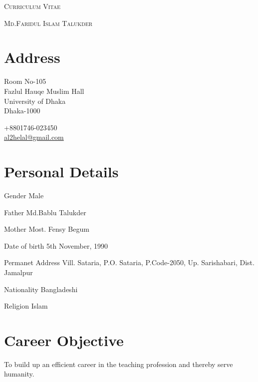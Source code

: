 \documentclass[a4paper]{article}
\begin{document}
\pagestyle{empty}

\begin{center}
\huge{\textsc{Curriculum Vitae}}
\vspace{\baselineskip}

\Large{\textsc{Md.Faridul Islam Talukder}}\\
\end{center}
\vspace{1.5\baselineskip}

\section{Address}
\noindent
\begin{minipage}{.7\textwidth}
  Room No-105\\
  Fazlul Hauqe Muslim Hall\\
  University of Dhaka\\
  Dhaka-1000\\
\end{minipage}
\begin{minipage}{.7\textwidth}
  \faPhone{} +8801746-023450\\
  \faEnvelopeO{}  \href{mailto:al2helal@gmail.com}{al2helal@gmail.com}\\
\end{minipage}

\section{Personal Details}
\begin{CV}
  \item[Gender] Male 
  \item[Father] Md.Bablu Talukder
  \item[Mother] Most. Fensy Begum
  \item[Date of birth] 5th November, 1990
  \item[Permanet Address] Vill. Sataria, P.O. Sataria, P.Code-2050, Up. Sarishabari, Dist. Jamalpur
  \item[Nationality] Bangladeshi
  \item[Religion] Islam
  \end{CV}

\section{Career Objective}
\begin{CV}
\item To build up an efficient career in the teaching profession and thereby serve humanity.
  \end{CV}
\end{document}
